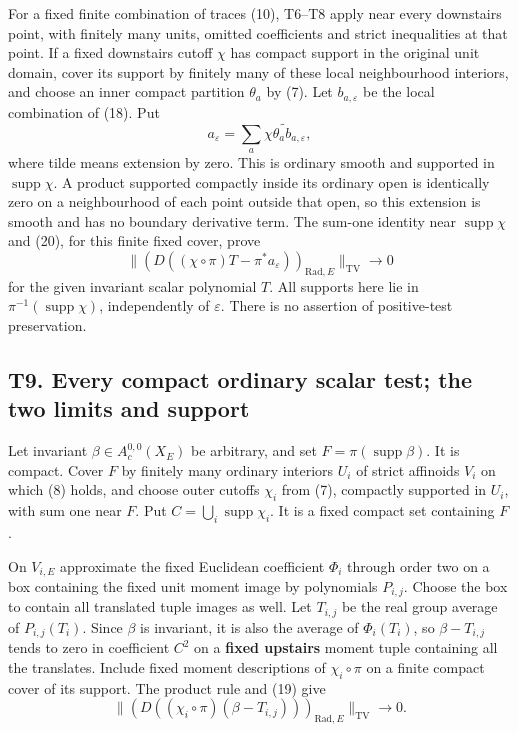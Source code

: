 \documentclass[
  10pt,
]{article}
\begin{document}
For a fixed finite combination of traces (10), T6--T8 apply near every
downstairs point, with finitely many units, omitted coefficients and
strict inequalities at that point. If a fixed downstairs cutoff \(\chi\)
has compact support in the original unit domain, cover its support by
finitely many of these local neighbourhood interiors, and choose an
inner compact partition \(\theta_a\) by (7). Let \(b_{a,\varepsilon}\)
be the local combination of (18). Put \[
        a_\varepsilon=
              \sum_a\widetilde{\chi\theta_a b_{a,\varepsilon}},     \tag{21}
\] where tilde means extension by zero. This is ordinary smooth and
supported in \(\operatorname{supp}\chi\). A product supported compactly
inside its ordinary open is identically zero on a neighbourhood of each
point outside that open, so this extension is smooth and has no boundary
derivative term. The sum-one identity near \(\operatorname{supp}\chi\)
and (20), for this finite fixed cover, prove \[
 \big\|(D((\chi\circ\pi)T-\pi^*a_\varepsilon))_{
                      \mathrm{Rad},E}\big\|_{\mathrm{TV}}\to0       \tag{22}
\] for the given invariant scalar polynomial \(T\). All supports here
lie in \(\pi^{-1}(\operatorname{supp}\chi)\), independently of
\(\varepsilon\). There is no assertion of positive-test preservation.

\subsection{T9. Every compact ordinary scalar test; the two limits and
support}\label{t9.-every-compact-ordinary-scalar-test-the-two-limits-and-support}

Let invariant \(\beta\in A_c^{0,0}(X_E)\) be arbitrary, and set
\(F=\pi(\operatorname{supp}\beta)\). It is compact. Cover \(F\) by
finitely many ordinary interiors \(U_i\) of strict affinoids \(V_i\) on
which (8) holds, and choose outer cutoffs \(\chi_i\) from (7), compactly
supported in \(U_i\), with sum one near \(F\). Put
\(C=\bigcup_i\operatorname{supp}\chi_i\). It is a fixed compact set
containing \(F\).

On \(V_{i,E}\) approximate the fixed Euclidean coefficient \(\Phi_i\)
through order two on a box containing the fixed unit moment image by
polynomials \(P_{i,j}\). Choose the box to contain all translated tuple
images as well. Let \(T_{i,j}\) be the real group average of
\(P_{i,j}(T_i)\). Since \(\beta\) is invariant, it is also the average
of \(\Phi_i(T_i)\), so \(\beta-T_{i,j}\) tends to zero in coefficient
\(C^2\) on a \textbf{fixed upstairs} moment tuple containing all the
translates. Include fixed moment descriptions of \(\chi_i\circ\pi\) on a
finite compact cover of its support. The product rule and (19) give \[
 \big\|(D((\chi_i\circ\pi)(\beta-T_{i,j})))_{
                     \mathrm{Rad},E}\big\|_{\mathrm{TV}}\to0.       \tag{23}
\]
\end{document}
